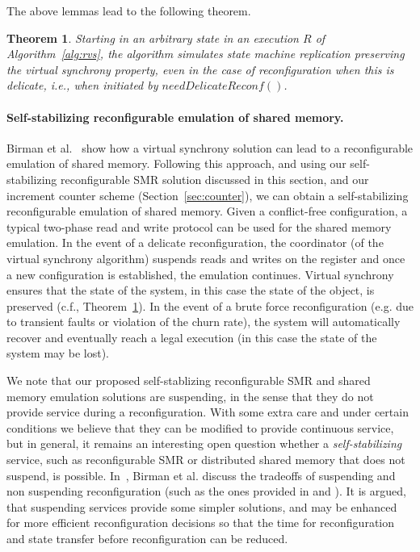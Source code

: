 \documentclass[11pt]{article}
\newtheorem{theorem}{Theorem}[section]
\begin{document}
\noindent The above lemmas lead to the following theorem.

\begin{theorem}
\label{thVS:finalApp}
Starting in an arbitrary state in an execution $R$ of Algorithm~\ref{alg:rvs}, the algorithm simulates state machine replication preserving the virtual synchrony property, even in the case of reconfiguration when this is delicate, i.e., when initiated by $needDelicateReconf()$.
\end{theorem}

\paragraph{Self-stabilizing reconfigurable emulation of shared memory.} Birman et al.~\cite{birmanMR2010} show how a virtual synchrony solution can lead to a reconfigurable emulation of shared memory. 
Following this approach, and using our self-stabilizing reconfigurable SMR solution discussed in this section, and our increment counter scheme (Section~\ref{sec:counter}), we can obtain a self-stabilizing reconfigurable emulation of shared memory.
Given a conflict-free configuration, a typical two-phase read and write protocol can be used for the shared memory emulation.
In the event of a delicate reconfiguration, the coordinator (of the virtual synchrony algorithm) suspends reads and writes on the register and once a new configuration is established, the emulation continues.
Virtual synchrony ensures that the state of the system, in this case the state of the object, is preserved (c.f., Theorem~\ref{thVS:finalApp}).
In the event of a brute force reconfiguration (e.g. due to transient faults or violation of the churn rate), the system will automatically recover and eventually reach a legal execution (in this case the state of the system may be lost).

We note that our proposed self-stablizing reconfigurable SMR and shared memory emulation solutions are suspending, in the sense that 
they do not provide service during a reconfiguration. With some extra care and under certain conditions we believe that they
can be modified to provide continuous service, but in general, it remains an interesting open question whether a \emph{self-stabilizing} 
service, such as reconfigurable SMR or distributed shared memory that does not suspend, is possible. In~\cite{birmanMR2010}, Birman et al. discuss the tradeoffs of suspending and non suspending reconfiguration (such as the ones provided in \cite{RAMBO} and \cite{DynaStore}). It is argued, that suspending services provide some simpler solutions, and may be enhanced for more efficient reconfiguration decisions so that the time for reconfiguration and state transfer before reconfiguration can be reduced.
\end{document}
